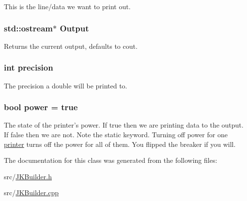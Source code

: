 This is the line/data we want to print out. \hypertarget{classJKBuilder_1_1IOManager_aafe3b1218427d92a689d147f74e74f4b}{
\subsubsection[{Output}]{\setlength{\rightskip}{0pt plus 5cm}std::ostream$\ast$ {\bf Output}}}
\label{classJKBuilder_1_1IOManager_aafe3b1218427d92a689d147f74e74f4b}


Returns the current output, defaults to cout. \hypertarget{classJKBuilder_1_1IOManager_aa95455ed52a8459fad69509a4a0411b5}{
\subsubsection[{precision}]{\setlength{\rightskip}{0pt plus 5cm}int {\bf precision}}}
\label{classJKBuilder_1_1IOManager_aa95455ed52a8459fad69509a4a0411b5}


The precision a double will be printed to. \hypertarget{classJKBuilder_1_1IOManager_aababa9aef0d20ddcfce2d78f41ae1dd8}{
\subsubsection[{power}]{\setlength{\rightskip}{0pt plus 5cm}bool {\bf power} = true}}
\label{classJKBuilder_1_1IOManager_aababa9aef0d20ddcfce2d78f41ae1dd8}


The state of the printer's power. If true then we are printing data to the output. If false then we are not. Note the static keyword. Turning off power for one \hyperlink{classJKBuilder_1_1printer}{printer} turns off the power for all of them. You flipped the breaker if you will. 

The documentation for this class was generated from the following files:\begin{DoxyCompactItemize}
\item 
src/\hyperlink{JKBuilder_8h}{JKBuilder.h}\item 
src/\hyperlink{JKBuilder_8cpp}{JKBuilder.cpp}\end{DoxyCompactItemize}
